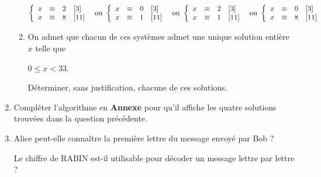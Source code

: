 \documentclass[10pt]{article}
\begin{document}
\begin{enumerate}
\begin{enumerate}
\[\left\{\begin{array}{l c l}
x &\equiv&2\quad [3]\\
x&\equiv &8\quad[11]
\end{array}\right. \: \text{ ou } \left\{\begin{array}{l c l}
 x &\equiv& 0\quad[3]\\
 x &\equiv& 1 \quad[11]
 \end{array}\right.\: \text{ ou } \left\{\begin{array}{l c l}
x  &\equiv& 2\quad[3]\\
x &\equiv&1 \quad[11]
\end{array}\right.\: \text{ ou } \left\{\begin{array}{l c l}
x &\equiv& 0\quad [3]\\
x &\equiv& 8 \quad [11]
\end{array}\right.\]

		\item On admet que chacun de ces systèmes admet une unique solution entière $x$ telle que

$0 \leqslant x < 33$.

Déterminer, sans justification, chacune de ces solutions.
	\end{enumerate}
\item Compléter l'algorithme en \textbf{Annexe} pour qu'il affiche les quatre solutions trouvées dans la
question précédente.
\item Alice peut-elle connaître la première lettre du message envoyé par Bob ? 
	
Le \og chiffre de RABIN \fg{} est-il utilisable pour décoder un message lettre par lettre ?
\end{enumerate}
\end{document}
